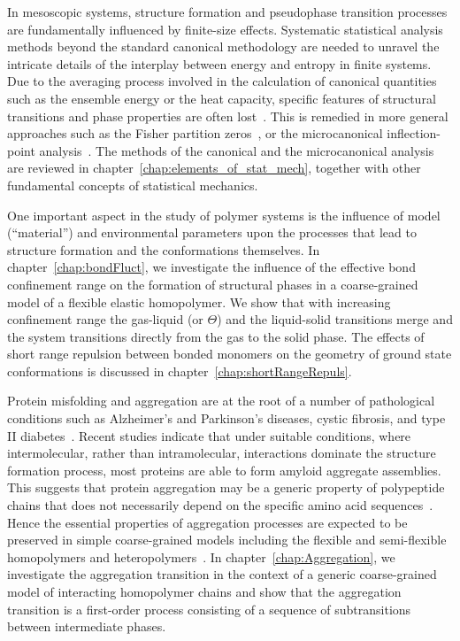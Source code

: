 \documentclass[12pt]{report}
\begin{document}
% 
In mesoscopic systems, structure formation and pseudophase transition processes are fundamentally influenced by finite-size effects. Systematic statistical analysis methods beyond the standard canonical methodology are needed to unravel the intricate details of the interplay between energy and entropy in finite systems. Due to the averaging process involved in the calculation of canonical quantities such as the ensemble energy or the heat capacity, specific features of structural transitions and phase properties are often lost~\cite{Bachmann2014}. This is remedied in more general approaches such as the Fisher partition zeros~\cite{fisher1,taylor1,rslb1,taylor2}, or the microcanonical inflection-point analysis~\cite{Schnabel2011,KaiQi2016}. The methods of the canonical and the microcanonical analysis are reviewed in chapter~\ref{chap:elements_of_stat_mech}, together with other fundamental concepts of statistical mechanics.
%

%
One important aspect in the study of polymer systems is the influence of model (``material'') and environmental parameters upon the processes that lead to structure formation and the conformations themselves. In chapter~\ref{chap:bondFluct}, we investigate the influence of the effective bond confinement range on the formation of structural phases in a coarse-grained model of a flexible elastic homopolymer. We show that with increasing confinement range the gas-liquid (or $ \Theta$) and the liquid-solid transitions merge and the system transitions directly from the gas to the solid phase. The effects of short range repulsion between bonded monomers on the geometry of ground state conformations is discussed in chapter~\ref{chap:shortRangeRepuls}. 
%

%
Protein misfolding and aggregation are at the root of a number of pathological conditions such as Alzheimer’s and Parkinson’s diseases, cystic fibrosis, and type II diabetes~\cite{Selkoe,Chiti}. Recent studies indicate that under suitable conditions, where intermolecular, rather than intramolecular, interactions dominate the structure formation process, most proteins are able to form amyloid aggregate assemblies. This suggests that protein aggregation may be a generic property of polypeptide chains that does not necessarily depend on the specific amino acid sequences~\cite{Kayed2003,Thirumalai}. Hence the essential properties of aggregation processes are expected to be preserved in simple coarse-grained models including the flexible and semi-flexible homopolymers and heteropolymers~\cite{Junghans2009}. In chapter~\ref{chap:Aggregation}, we investigate the aggregation transition in the context of a generic coarse-grained model of interacting homopolymer chains and show that the aggregation transition is a first-order process consisting of a sequence of subtransitions between intermediate phases.
%
\end{document}
